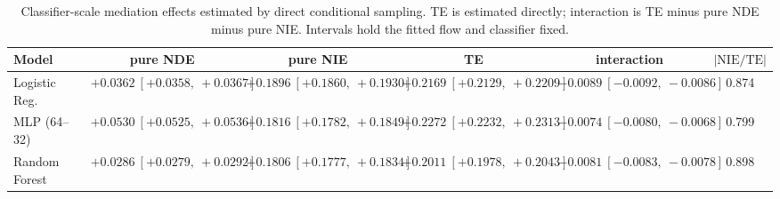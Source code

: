 \begin{table}[htbp]
  \centering
  \caption{Classifier-scale mediation effects estimated by direct conditional sampling. TE is estimated directly; interaction is TE minus pure NDE minus pure NIE. Intervals hold the fitted flow and classifier fixed.}
  \label{tab:german_synth_gap_overall}
  \begin{tabular}{lccccc}
    \toprule
    Model & pure NDE & pure NIE & TE & interaction & $|\mathrm{NIE}/\mathrm{TE}|$ \\
    \midrule
    Logistic Reg. & $+0.0362\ [+0.0358,\ +0.0367]$ & $+0.1896\ [+0.1860,\ +0.1930]$ & $+0.2169\ [+0.2129,\ +0.2209]$ & $-0.0089\ [-0.0092,\ -0.0086]$ & 0.874 \\
    MLP (64--32) & $+0.0530\ [+0.0525,\ +0.0536]$ & $+0.1816\ [+0.1782,\ +0.1849]$ & $+0.2272\ [+0.2232,\ +0.2313]$ & $-0.0074\ [-0.0080,\ -0.0068]$ & 0.799 \\
    Random Forest & $+0.0286\ [+0.0279,\ +0.0292]$ & $+0.1806\ [+0.1777,\ +0.1834]$ & $+0.2011\ [+0.1978,\ +0.2043]$ & $-0.0081\ [-0.0083,\ -0.0078]$ & 0.898 \\
    \bottomrule
  \end{tabular}
\end{table}
